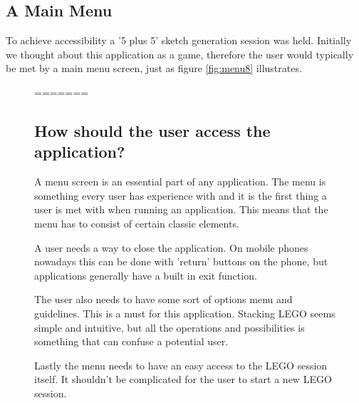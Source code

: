 \subsection{A Main Menu}
To achieve accessibility a '5 plus 5' sketch generation session was held. Initially we thought about this application as a game, therefore the user would typically be met by a main menu screen, just as figure \ref{fig:menu8} illustrates.
\begin{figure}[h]
=======
\subsection{How should the user access the application?}
A menu screen is an essential part of any application. The menu is something every user has experience with and it is the first thing a user is met with when running an application. This means that the menu has to consist of certain classic elements.\par A user needs a way to close the application. On mobile phones nowadays this can be done with 'return' buttons on the phone, but applications generally have a built in exit function.\par
The user also needs to have some sort of options menu and guidelines. This is a must for this application. Stacking LEGO seems simple and intuitive, but all the operations and possibilities is something that can confuse a potential user. \par
Lastly the menu needs to have an easy access to the LEGO session itself. It shouldn't be complicated for the user to start a new LEGO session. 

\end{figure}
